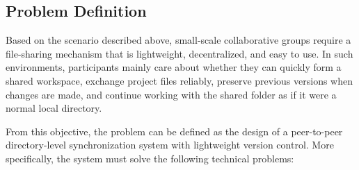 \subsection{Problem Definition}

Based on the scenario described above, small-scale collaborative groups require a file-sharing mechanism that is lightweight, decentralized, and easy to use. In such environments, participants mainly care about whether they can quickly form a shared workspace, exchange project files reliably, preserve previous versions when changes are made, and continue working with the shared folder as if it were a normal local directory.\par
From this objective, the problem can be defined as the design of a peer-to-peer directory-level synchronization system with lightweight version control. More specifically, the system must solve the following technical problems:

